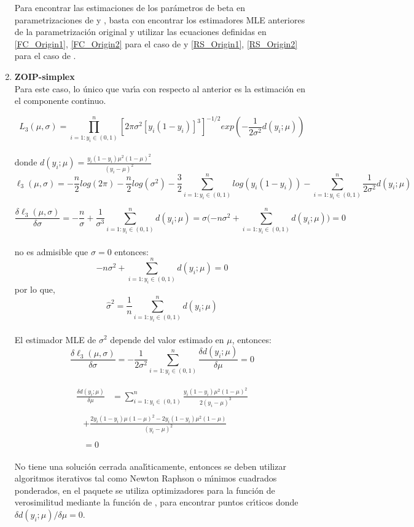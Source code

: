 \begin{enumerate}
Para encontrar las estimaciones de los par\'{a}metros de beta en parametrizaciones de \cite{Ferrari2} y \cite{Stasinopoulos2}, basta con encontrar los estimadores MLE anteriores de la parametrizaci\'{o}n original y utilizar las ecuaciones definidas en \eqref{FC_Origin1}, \eqref{FC_Origin2} para el caso de \cite{Ferrari2} y \eqref{RS_Origin1}, \eqref{RS_Origin2} para el caso de \cite{Stasinopoulos2}.

\item \textbf{ZOIP-simplex}\\

Para este caso, lo \'{u}nico que var\'{\i}a con respecto al anterior es la estimaci\'{o}n en el componente continuo.

\[
L_3(\mu,\sigma)=\prod_{i=1:y_i \in (0,1)}^{n}\left[{2\pi \sigma^{2}[y_i(1-y_i)]^{3}}\right]^{-1/2}exp\left(-\frac{1}{2\sigma^2}d(y_i;\mu)\right)
\]
\\
donde $d(y_i ;\mu)=\frac{y_i(1-y_i)\mu^2(1-\mu)^2}{(y_i-\mu)^2}$
\[
\ell_3(\mu,\sigma)=-\frac{n}{2}log(2\pi)-\frac{n}{2}log(\sigma^2)-\frac{3}{2}\sum_{i=1:y_i \in (0,1)}^{n}{log(y_i(1-y_i))}-\sum_{i=1:y_i \in (0,1)}^{n}{\frac{1}{2\sigma^2}d(y_i;\mu)}
\]

\[
\frac{\delta \ell_3(\mu,\sigma)}{\delta \sigma}=-\frac{n}{\sigma}+\frac{1}{\sigma^3}\sum_{i=1:y_i \in (0,1)}^{n}{d(y_i;\mu)}=\sigma(-n\sigma^2+\sum_{i=1:y_i \in (0,1)}^{n}{d(y_i;\mu))}=0
\]
\\
no es admisible que $\sigma=0$ entonces:
\[
-n\sigma^2+\sum_{i=1:y_i \in (0,1)}^{n}{d(y_i;\mu)}=0
\]
por lo que,
\[
\hat{\sigma}^2=\frac{1}{n}\sum_{i=1:y_i \in (0,1)}^{n}{d(y_i;\mu)}
\]
\\
El estimador MLE de $\sigma^2$ depende del valor estimado en $\mu$, entonces:
\[
\frac{\delta \ell_3(\mu,\sigma)}{\delta \sigma}=-\frac{1}{2\sigma^2}\sum_{i=1:y_i \in (0,1)}^{n}{\frac{\delta d(y_i;\mu)}{\delta\mu}}=0
\]

\begin{align*}
\begin{split}
\frac{\delta d(y_i;\mu)}{\delta\mu} & =\sum_{i=1:y_i \in (0,1)}^{n}\frac{y_i(1-y_i)\mu^2(1-\mu)^2}{2(y_i-\mu)^3}
\end{split}\\
\begin{split}
& + \frac{2y_i(1-y_i)\mu(1-\mu)^2-2y_i(1-y_i)\mu^2(1-\mu)}{(y_i-\mu)^2} 
\end{split}\\
\begin{split}
& = 0
\end{split}
\end{align*}

No tiene una soluci\'{o}n cerrada anal\'{\i}ticamente, entonces se deben utilizar algoritmos iterativos tal como Newton Raphson o m\'{\i}nimos cuadrados ponderados, en el paquete  se utiliza optimizadores para la funci\'{o}n de verosimilitud mediante la funci\'{o}n  de , para encontrar puntos cr\'{\i}ticos donde ${\delta d(y_i;\mu)}/{\delta\mu}=0$.

\end{enumerate}

